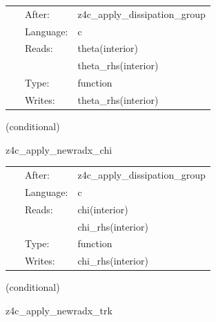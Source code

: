 

\hspace{5mm}

 \begin{tabular*}{160mm}{cll} 
~ & After:  & z4c\_apply\_dissipation\_group \\ 
~ & Language:  & c \\ 
~ & Reads:  & theta(interior) \\ 
~& ~ &theta\_rhs(interior)\\ 
~ & Type:  & function \\ 
~ & Writes:  & theta\_rhs(interior) \\ 
\end{tabular*} 


\vspace{5mm}

   (conditional) 

\hspace{5mm} z4c\_apply\_newradx\_chi 



\hspace{5mm}

 \begin{tabular*}{160mm}{cll} 
~ & After:  & z4c\_apply\_dissipation\_group \\ 
~ & Language:  & c \\ 
~ & Reads:  & chi(interior) \\ 
~& ~ &chi\_rhs(interior)\\ 
~ & Type:  & function \\ 
~ & Writes:  & chi\_rhs(interior) \\ 
\end{tabular*} 


\vspace{5mm}

   (conditional) 

\hspace{5mm} z4c\_apply\_newradx\_trk 



